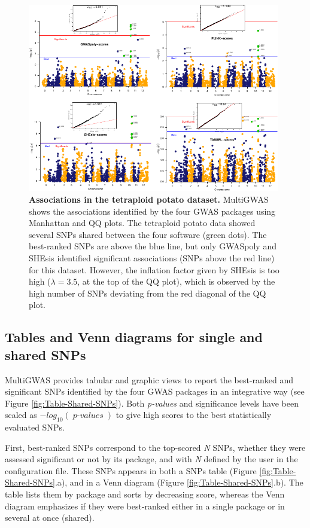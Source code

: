 \documentclass{article}
\newcommand{\mathB}[1]{{\operatorname{\mathit{#1}}}}
\begin{document}
\begin{figure}[H]
\begin{centering}
\includegraphics[width=11cm]{05_figure-manhattan-QQ-plots}
\par\end{centering}
\caption{\textbf{{Associations in the tetraploid potato dataset.}} MultiGWAS shows the associations identified by the four GWAS packages using Manhattan and QQ plots. The tetraploid potato data showed several SNPs shared between the four software (green dots). The best-ranked SNPs are above the blue line, but only GWASpoly and SHEsis identified significant associations (SNPs above the red line) for this dataset. However, the inflation factor given by SHEsis is too high ($\lambda=3.5$, at the top of the QQ plot), which is observed by the high number of SNPs deviating from the red diagonal of the QQ plot. \label{fig:view-qqmanhattan}}
\end{figure}


\subsection{Tables and Venn diagrams for single and shared SNPs}

MultiGWAS provides tabular and graphic views to report the best-ranked and significant SNPs identified by the four GWAS packages in an integrative way (see Figure \ref{fig:Table-Shared-SNPs}). Both \emph{p-values} and significance levels have been scaled as $-log_{10} (\mathB{p-values})$ to give high scores to the best statistically evaluated SNPs.

First, best-ranked SNPs correspond to the top-scored \emph{N} SNPs, whether they were assessed significant or not by its package, and with\emph{ N} defined by the user in the configuration file. These SNPs appears in both a SNPs table (Figure \ref{fig:Table-Shared-SNPs}.a), and in a Venn diagram (Figure \ref{fig:Table-Shared-SNPs}.b). The table lists them by package and sorts by decreasing score, whereas the Venn diagram emphasizes if they were best-ranked either in a single package or in several at once (shared).
\end{document}

